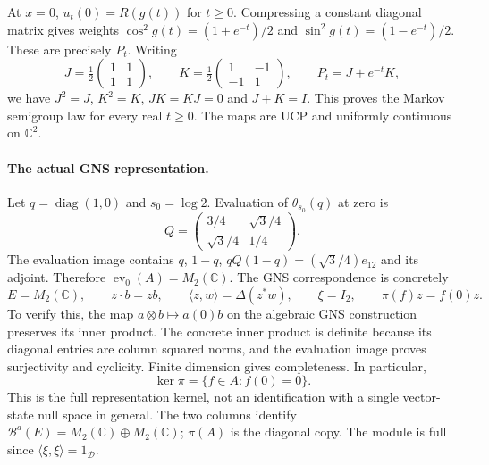 \documentclass[11pt]{article}
\newcommand{\C}{\mathbb C}
\newcommand{\D}{\mathcal D}
\newcommand{\Ba}{\mathcal B^a}
\DeclareMathOperator{\diag}{diag}
\DeclareMathOperator{\ev}{ev}
\begin{document}
At $x=0$, $u_t(0)=R(g(t))$ for $t\geq0$. Compressing a constant
diagonal matrix gives weights
$\cos^2 g(t)=(1+e^{-t})/2$ and $\sin^2 g(t)=(1-e^{-t})/2$.
These are precisely $P_t$. Writing
\[
 J=\tfrac12\begin{pmatrix}1&1\\1&1\end{pmatrix},\qquad
 K=\tfrac12\begin{pmatrix}1&-1\\-1&1\end{pmatrix},\qquad P_t=J+e^{-t}K,
\]
we have $J^2=J$, $K^2=K$, $JK=KJ=0$ and $J+K=I$.
This proves the Markov semigroup law for every real $t\geq0$.
The maps are UCP and uniformly continuous on $\C^2$.

\paragraph{The actual GNS representation.}
Let $q=\diag(1,0)$ and $s_0=\log2$. Evaluation of
$\theta_{s_0}(q)$ at zero is
\[
 Q=\begin{pmatrix}3/4&\sqrt3/4\\\sqrt3/4&1/4\end{pmatrix}.
\]
The evaluation image contains $q$, $1-q$, $qQ(1-q)=(\sqrt3/4)e_{12}$
and its adjoint. Therefore $\ev_0(A)=M_2(\C)$.
The GNS correspondence is concretely
\[
 E=M_2(\C),\qquad z\cdot b=zb,\qquad
 \langle z,w\rangle=\Delta(z^*w),\qquad \xi=I_2,\qquad
 \pi(f)z=f(0)z.
\]
To verify this, the map $a\otimes b\mapsto a(0)b$ on the algebraic
GNS construction preserves its inner product. The concrete inner
product is definite because its diagonal entries are column squared
norms, and the evaluation image proves surjectivity and cyclicity.
Finite dimension gives completeness. In particular,
\[
 \ker\pi=\{f\in A:f(0)=0\}.
\]
This is the full representation kernel, not an identification with a
single vector-state null space in general. The two columns identify
$\Ba(E)=M_2(\C)\oplus M_2(\C)$; $\pi(A)$ is the diagonal copy.
The module is full since $\langle\xi,\xi\rangle=1_{\D}$.
\end{document}
